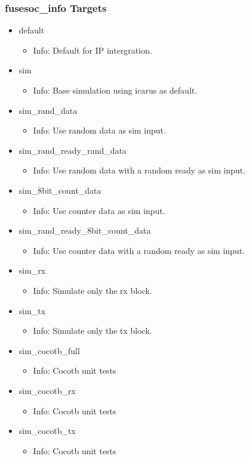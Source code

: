 \subsubsection{fusesoc\_info Targets}
\begin{itemize}
\item default
	\begin{itemize}
	\item[$\space$] Info: Default for IP intergration.
	\end{itemize}
\item sim
	\begin{itemize}
	\item[$\space$] Info: Base simulation using icarus as default.
	\end{itemize}
\item sim\_rand\_data
	\begin{itemize}
	\item[$\space$] Info: Use random data as sim input.
	\end{itemize}
\item sim\_rand\_ready\_rand\_data
	\begin{itemize}
	\item[$\space$] Info: Use random data with a random ready as sim input.
	\end{itemize}
\item sim\_8bit\_count\_data
	\begin{itemize}
	\item[$\space$] Info: Use counter data as sim input.
	\end{itemize}
\item sim\_rand\_ready\_8bit\_count\_data
	\begin{itemize}
	\item[$\space$] Info: Use counter data with a random ready as sim input.
	\end{itemize}
\item sim\_rx
	\begin{itemize}
	\item[$\space$] Info: Simulate only the rx block.
	\end{itemize}
\item sim\_tx
	\begin{itemize}
	\item[$\space$] Info: Simulate only the tx block.
	\end{itemize}
\item sim\_cocotb\_full
	\begin{itemize}
	\item[$\space$] Info: Cocotb unit tests
	\end{itemize}
\item sim\_cocotb\_rx
	\begin{itemize}
	\item[$\space$] Info: Cocotb unit tests
	\end{itemize}
\item sim\_cocotb\_tx
	\begin{itemize}
	\item[$\space$] Info: Cocotb unit tests
	\end{itemize}
\end{itemize}
